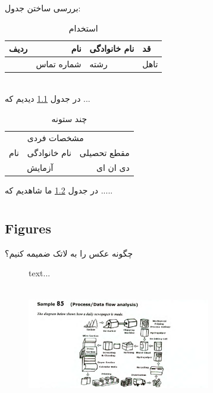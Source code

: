 \documentclass{book}
\author{علی}
\begin{document}
	\maketitle
	\tableofcontents
	\singlespacing
	\listoffigures
	\listoftables
	\Time
\chapter{}	
\BNaz
بررسی ساختن جدول:
\begin{table}[h!]

\begin{center}
 \begin{tabular}{|c|r|p{2cm}||l|}
	\hline
	ردیف &
	\textbf{نام} &
	\centering
	 نام خانوادگی & قد \\
	\hline
	&
شماره تماس &
\centering
 رشته & تاهل\\
	\hline
 \end{tabular}
\end{center}
\caption{استخدام}
\label{Tab1}
\end{table}
\\
	در جدول \ref{Tab1} دیدیم که ...
	
\begin{table}[h!]
	\begin{center}
		\begin{tabular}{|c|c|r|}
			\hline
			&
			\multicolumn{2}{|l|}{مشخصات فردی} \\
			\cline{1-3}

نام & نام خانوادگی & مقطع تحصیلی 
\\
\hline
\multicolumn{2}{|c|}{آزمایش} 
&
دی ان ای \\
\hline
		\end{tabular}
	\end{center}
\caption{چند ستونه}
\label{Tab2}
\end{table}
در جدول \ref{Tab2}
ما شاهدیم که .....
\chapter{}
\section{Figures}
چگونه عکس را به لاتک ضمیمه کنیم؟
\begin{figure}[h!]
	\caption*{text...}
	\begin{center}
		\includegraphics[width=8cm, height=5cm]{Capture.PNG}
	\end{center}
\caption{}
\label{Fig1}
\end{figure}
\end{document}
